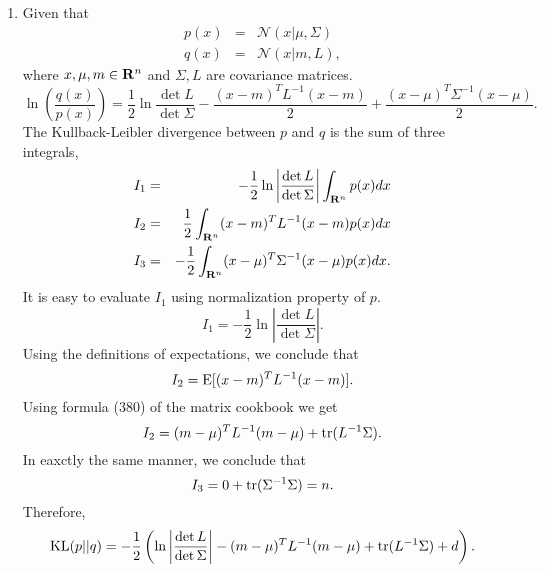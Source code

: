 \begin{enumerate}
\item Given that
\begin{eqnarray*}
p(x) &=& \mathcal{N}(x | \mu, \Sigma) \\
q(x) &=& \mathcal{N}(x | m, L),
\end{eqnarray*}
where $x, \mu, m \in \mathbf{R}^n$ and $\Sigma, L$ are covariance matrices.
\[
\ln\left(\frac{q(x)}{p(x)}\right) = \frac{1}{2}\ln\frac{\det L}{\det\Sigma} - \frac{(x - m)^TL^{-1}(x - m)}{2} + \frac{(x - \mu)^T\Sigma^{-1}(x - \mu)}{2}.
\]
The Kullback-Leibler divergence between $p$ and $q$ is the sum of three integrals,
\begin{eqnarray*}
I_1 &=& -\frac{1}{2}\ln\left|\frac{\det L}{\det\Sigma}\right|\int_{\mathbf{R}^n}p(x)dx \\
I_2 &=& \frac{1}{2}\int_{\mathbf{R}^n}(x-m)^TL^{-1}(x-m)p(x)dx \\
I_3 &=& -\frac{1}{2}\int_{\mathbf{R}^n}(x-\mu)^T\Sigma^{-1}(x-\mu)p(x)dx.
\end{eqnarray*}
It is easy to evaluate $I_1$ using normalization property of $p$.
\begin{equation}\label{c2pe11}
I_1 = -\frac{1}{2}\ln\left|\frac{\det L}{\det\Sigma}\right|.
\end{equation}
Using the definitions of expectations, we conclude that
\[
I_2 = \operatorname{E}[(x - m)^TL^{-1}(x-m)].
\]
Using formula (380) of the matrix cookbook \cite{petersen2012matrix} we get
\begin{equation}\label{c2pe12}
I_2 = (m - \mu)^TL^{-1}(m - \mu) + \operatorname{tr}(L^{-1}\Sigma).
\end{equation}
In eaxctly the same manner, we conclude that
\begin{equation}\label{c2pe13}
I_3 = 0 + \operatorname{tr}(\Sigma^{-1}\Sigma) = n.
\end{equation}
Therefore,
\[
\operatorname{KL}(p||q) = -\frac{1}{2}\left(\ln\left|\frac{\det L}{\det\Sigma}\right| - (m - \mu)^T L^{-1}(m - \mu) + \operatorname{tr}(L^{-1}\Sigma) + d\right).
\]


\end{enumerate}
